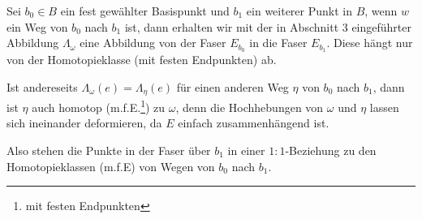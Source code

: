 \documentclass[a4paper,10pt]{scrartcl}
\begin{document}
Sei $b_0\in B$ ein fest gewählter Basispunkt und $b_1$ ein weiterer Punkt in $B$, wenn $w$ ein Weg von $b_0$ nach $b_1$ ist, dann erhalten wir mit der in Abschnitt 3 eingeführter Abbildung $\Lambda_\omega$ eine Abbildung von der Faser $E_{b_0}$ in die Faser $E_{b_1}$. Diese hängt nur von der Homotopieklasse (mit festen Endpunkten) ab.\\
\begin{figure}[H]
 \centering
\fixme[fig101]
\caption{}
\end{figure}
Ist andereseits $\Lambda_{\omega}(e)=\Lambda_{\eta}(e)$ für einen anderen Weg $\eta$ von $b_0$ nach $b_1$, dann ist $\eta$ auch homotop (m.f.E.\footnote{mit festen Endpunkten}) zu $\omega$, denn die Hochhebungen von $\omega$ und $\eta$ lassen sich ineinander deformieren, da $E$ einfach zusammenhängend ist.

Also stehen die Punkte in der Faser über $b_1$ in einer $1:1$-Beziehung zu den Homotopieklassen (m.f.E) von Wegen von $b_0$ nach $b_1$.
\begin{figure}[H]
\centering
 \fixme[fig102]
\caption{}
\end{figure}
\end{document}
